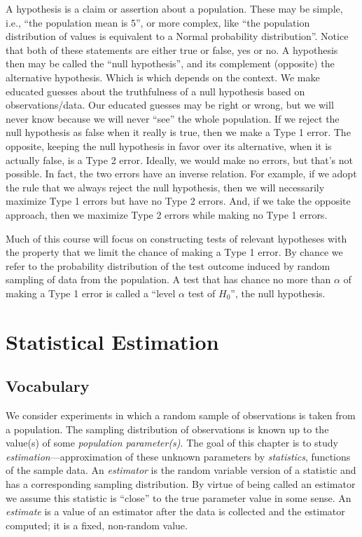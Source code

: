 \documentclass[
]{book}
\begin{document}
A hypothesis is a claim or assertion about a population. These may be simple, i.e., ``the population mean is 5'', or more complex, like ``the population distribution of values is equivalent to a Normal probability distribution''. Notice that both of these statements are either true or false, yes or no. A hypothesis then may be called the ``null hypothesis'', and its complement (opposite) the alternative hypothesis. Which is which depends on the context. We make educated guesses about the truthfulness of a null hypothesis based on observations/data. Our educated guesses may be right or wrong, but we will never know because we will never ``see'' the whole population. If we reject the null hypothesis as false when it really is true, then we make a Type 1 error. The opposite, keeping the null hypothesis in favor over its alternative, when it is actually false, is a Type 2 error. Ideally, we would make no errors, but that's not possible. In fact, the two errors have an inverse relation. For example, if we adopt the rule that we always reject the null hypothesis, then we will necessarily maximize Type 1 errors but have no Type 2 errors. And, if we take the opposite approach, then we maximize Type 2 errors while making no Type 1 errors.

Much of this course will focus on constructing tests of relevant hypotheses with the property that we limit the chance of making a Type 1 error. By chance we refer to the probability distribution of the test outcome induced by random sampling of data from the population. A test that has chance no more than \(\alpha\) of making a Type 1 error is called a ``level \(\alpha\) test of \(H_0\)'', the null hypothesis.

\hypertarget{statistical-estimation}{%
\chapter{Statistical Estimation}\label{statistical-estimation}}

\hypertarget{vocabulary}{%
\section{Vocabulary}\label{vocabulary}}

We consider experiments in which a random sample of observations is taken from a population. The sampling distribution of observations is known up to the value(s) of some \emph{population parameter(s)}. The goal of this chapter is to study \emph{estimation}---approximation of these unknown parameters by \emph{statistics}, functions of the sample data. An \emph{estimator} is the random variable version of a statistic and has a corresponding sampling distribution. By virtue of being called an estimator we assume this statistic is ``close'' to the true parameter value in some sense. An \emph{estimate} is a value of an estimator after the data is collected and the estimator computed; it is a fixed, non-random value.
\end{document}
